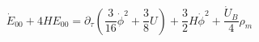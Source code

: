 \begin{equation}
\dot E_{00}+4HE_{00}= \partial_{\tau}\left(\frac{3}{16}\dot \phi^2+\frac{3}{8}U\right)+
\frac{3}{2}H\dot\phi^2 +\frac{\dot U_B}{4}\rho_m
\end{equation}

